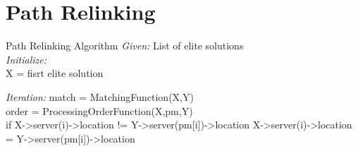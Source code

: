 \section{Path Relinking}
\begin{frame}{Path Relinking Algorithm}{}
  \textit{Given:}
  List of elite solutions \\
  \textit{Initialize:} \\
  X = fisrt elite solution \hfill
  
  \textit{Iteration:}
  match = MatchingFunction(X,Y)\\
  order = ProcessingOrderFunction(X,pm,Y)\\
  if X->server(i)->location != Y->server(pm[i])->location
  X->server(i)->location = Y->server(pm[i])->location
\end{frame}
